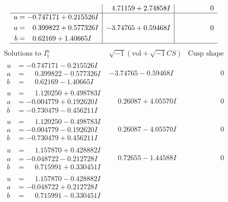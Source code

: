 \documentclass[1p]{elsarticle_modified}
\theoremstyle{definition}
\newcommand{\I}{\sqrt{-1}}
\begin{document}
$$\begin{array}{c|c|c}
 & \phantom{-}4.71159 + 2.74858 I & \phantom{-0.000000 } 0 \\ \hline\begin{aligned}
u &= -0.747171 + 0.215526 I \\
a &= \phantom{-}0.399822 + 0.577326 I \\
b &= \phantom{-}0.62169 + 1.40665 I\end{aligned}
 & -3.74765 + 0.59468 I & \phantom{-0.000000 } 0\\
 \hline 
 \end{array}$$\newpage$$\begin{array}{c|c|c}  
\text{Solutions to }I^u_{1}& \I (\text{vol} + \sqrt{-1}CS) & \text{Cusp shape}\\
 \hline 
\begin{aligned}
u &= -0.747171 - 0.215526 I \\
a &= \phantom{-}0.399822 - 0.577326 I \\
b &= \phantom{-}0.62169 - 1.40665 I\end{aligned}
 & -3.74765 - 0.59468 I & \phantom{-0.000000 } 0 \\ \hline\begin{aligned}
u &= \phantom{-}1.120250 + 0.498783 I \\
a &= -0.004779 + 0.192620 I \\
b &= -0.730479 - 0.456211 I\end{aligned}
 & \phantom{-}0.26087 + 4.05570 I & \phantom{-0.000000 } 0 \\ \hline\begin{aligned}
u &= \phantom{-}1.120250 - 0.498783 I \\
a &= -0.004779 - 0.192620 I \\
b &= -0.730479 + 0.456211 I\end{aligned}
 & \phantom{-}0.26087 - 4.05570 I & \phantom{-0.000000 } 0 \\ \hline\begin{aligned}
u &= \phantom{-}1.157870 + 0.428882 I \\
a &= -0.048722 - 0.212728 I \\
b &= \phantom{-}0.715991 + 0.330451 I\end{aligned}
 & \phantom{-}0.72655 - 1.44588 I & \phantom{-0.000000 } 0 \\ \hline\begin{aligned}
u &= \phantom{-}1.157870 - 0.428882 I \\
a &= -0.048722 + 0.212728 I \\
b &= \phantom{-}0.715991 - 0.330451 I\end{aligned}

\end{array}$$
\end{document}
